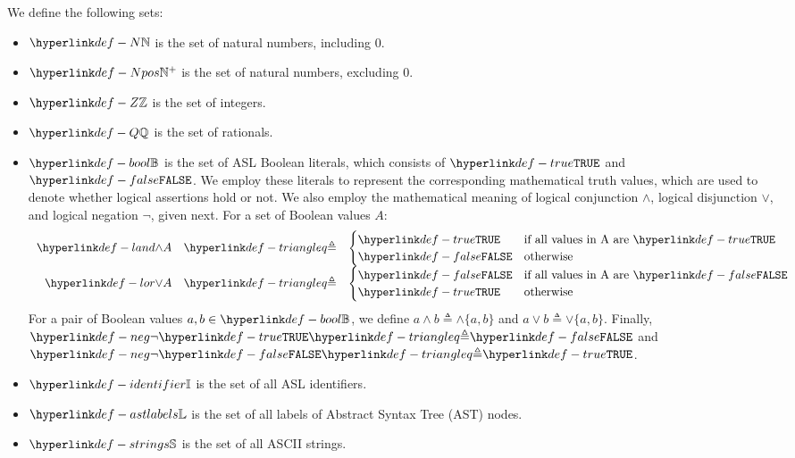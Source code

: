 We define the following sets:
\begin{itemize}
\item \hypertarget{def-N}{
    $\N$ is the set of natural numbers, including $0$.
}

\item \hypertarget{def-Npos}{
    $\Npos$ is the set of natural numbers, excluding $0$.
}

\item
\hypertarget{def-Z}{
    $\Z$ is the set of integers.
}

\item
\hypertarget{def-Q}{
    $\Q$ is the set of rationals.
}

\hypertarget{def-bool}{}
\hypertarget{def-false}{}
\hypertarget{def-true}{}
\item $\Bool$ is the set of ASL Boolean literals, which consists of $\True$ and $\False$.
We employ these literals to represent the corresponding mathematical truth values,
which are used to denote whether logical assertions hold or not.
\hypertarget{def-land}{}
\hypertarget{def-lor}{}
We also employ the mathematical meaning of logical conjunction $\land$, logical disjunction $\lor$,
and logical negation $\neg$, given next.
For a set of Boolean values $A$:
\[
  \begin{array}{rcl}
  \land A &\triangleq&
  \begin{cases}
    \True & \text{if all values in A are }\True\\
    \False & \text{otherwise}
  \end{cases}\\
  \lor A &\triangleq&
  \begin{cases}
    \False & \text{if all values in A are }\False\\
    \True & \text{otherwise}
  \end{cases}\\
\end{array}
\]
\hypertarget{def-neg}{}
For a pair of Boolean values $a,b\in\Bool$, we define $a \land b \triangleq \land\{a, b\}$
and $a \lor b \triangleq \lor\{a, b\}$.
Finally, $\neg\True\triangleq\False$ and $\neg\False\triangleq\True$.

\item
\hypertarget{def-identifier}{}
    $\Identifiers$ is the set of all ASL identifiers.

\item
\hypertarget{def-astlabels}{}
    $\astlabels$ is the set of all labels of Abstract Syntax Tree (AST) nodes.

\item
\hypertarget{def-strings}{}
    $\Strings$ is the set of all ASCII strings.
\end{itemize}


